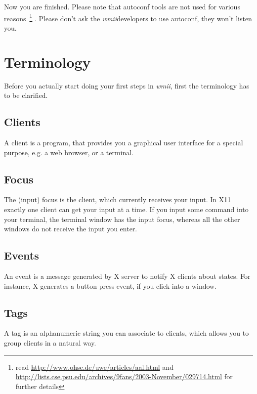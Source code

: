 \documentclass[12pt,a4paper]{article} %
\newcommand{\hrefx}[1]{\href{#1}{#1}} %
\newcommand{\wmii}{\emph{wmii}}
\begin{document}
    Now you are finished. Please note that autoconf tools are not used
    for various reasons~\footnote{ read
      \hrefx{http://www.ohse.de/uwe/articles/aal.html} and
      \hrefx{http://lists.cse.psu.edu/archives/9fans/2003-November/029714.html}
      for further details} . Please don't ask the \wmii developers to use autoconf,
    they won't listen you.


    \section{Terminology}
    \label{sec:terms}  

    Before you actually start doing your first steps in \wmii, first the
    terminology has to be clarified.

    \subsection{Clients}

    A client is a program, that provides you a graphical user interface for
    a special purpose, e.g. a web browser, or a terminal.
    
    \subsection{Focus}

    The (input) focus is the client, which currently receives your input.
    In X11 exactly one client can get your input at a time. If you input
    some command into your terminal, the terminal window has the input focus,
    whereas all the other windows do not receive the input you enter.
    
    \subsection{Events}

    An event is a message generated by X server to notify X clients about
    states. For instance,  X generates a button press event, if you click
    into a window.
    
    \subsection{Tags}

    A tag is an alphanumeric string you can associate to clients,
    which allows you to group clients in a natural way.
    
\end{document}
